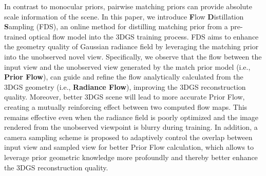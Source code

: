 
%
In contrast to monocular priors, pairwise matching priors can provide absolute scale information of the scene. 
%
In this paper, we introduce \textbf{F}low \textbf{D}istillation \textbf{S}ampling (FDS), an online method for distilling matching prior from a pre-trained optical flow model into the 3DGS training process. FDS aims to enhance the geometry quality of Gaussian radiance field by leveraging the matching prior into the unobserved novel view. 
%
Specifically, we observe that the flow between the input view and the unobserved view generated by the match prior model (i.e., \textbf{Prior Flow}), can guide and refine the flow analytically calculated from the 3DGS geometry (i.e., \textbf{Radiance Flow}), improving the 3DGS reconstruction quality. 
%
Moreover, better 3DGS scene will lead to more accurate Prior Flow, creating a mutually reinforcing effect between two computed flow maps. This remains effective even when the radiance field is poorly optimized and the image rendered from the unobserved viewpoint is blurry during training. 
%
In addition, a camera sampling scheme is proposed to adaptively control the overlap between input view and sampled view for better Prior Flow calculation, which allows to leverage prior geometric knowledge more profoundly and thereby better enhance the 3DGS reconstruction quality.



